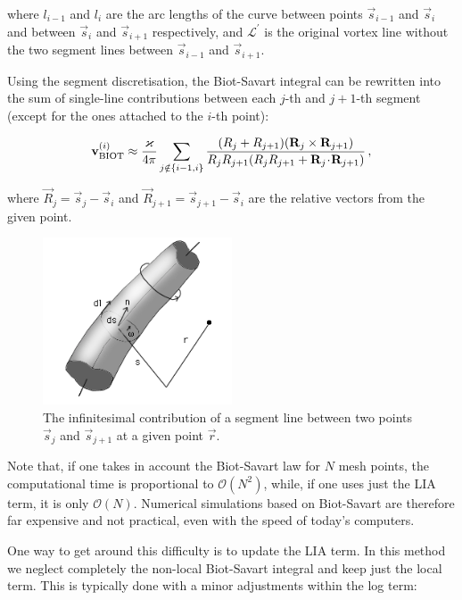 where $l_{i-1}$ and $l_i$ are the arc lengths of the curve between
points $\vec{s}_{i-1}$ and $\vec{s}_i$ and between $\vec{s}_i$ and $\vec{s}_{i+1}$ respectively, and $\mathcal{L}^{\prime}$ is the original vortex line without the two segment lines between $\vec{s}_{i-1}$ and $\vec{s}_{i+1}$.

Using the segment discretisation, the Biot-Savart integral can be rewritten into the sum of single-line contributions between each $j$-th and $j+1$-th segment (except for the ones attached to the $i$-th point):

\begin{equation}
\mathbf{v}_{\text{BIOT}}^{(i)} \approx
\frac{\varkappa}{4\pi}
\sum_{j \notin \{i-1, i\}}
\frac{(R_j + R_{j+1}) (\mathbf{R}_j \times \mathbf{R}_{j+1})}{R_j R_{j+1} (R_j R_{j+1} + \mathbf{R}_j \!\cdot\! \mathbf{R}_{j+1})}\,,
\end{equation}

where $\vec{R}_j = \vec{s}_j - \vec{s}_i$ and $\vec{R}_{j+1} = \vec{s}_{j+1} - \vec{s}_i$ are the relative vectors from the given point.

\begin{figure}[h]
	\centering
	\includegraphics[width=0.5\textwidth]{graphics/simul/biot}
	\caption{The infinitesimal contribution of a segment line between two points $\vec{s}_j$ and $\vec{s}_{j+1}$ at a given point $\vec{r}$.}
\end{figure}

Note that, if one takes in account the Biot-Savart law for $N$ mesh points, the computational time is proportional to $\mathcal{O}(N^2)$, while, if one uses just the LIA term, it is only $\mathcal{O}(N)$. Numerical simulations based on Biot-Savart are therefore far expensive and not practical, even with the speed of today's computers.

One way to get around this difficulty is to update the LIA term. In this method we neglect completely the non-local Biot-Savart integral and keep just the local term. This is typically done with a minor adjustments within the log term:

